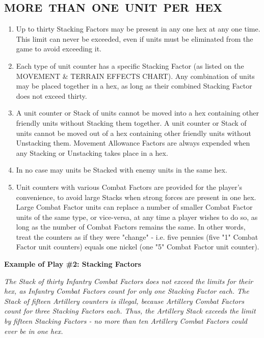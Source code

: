 \subsection[MORE THAN ONE UNIT PER HEX]{\mbox{MORE THAN ONE UNIT PER HEX}}

\begin{enumerate}
  \item Up to thirty Stacking Factors may be present in any one hex at any one time. This limit can never be exceeded, even if units must be eliminated from the game to avoid exceeding it.

  \item Each type of unit counter has a specific Stacking Factor (as listed on the MOVEMENT \& TERRAIN EFFECTS CHART). Any combination of units may be placed together in a hex, as long as their combined Stacking Factor does not exceed thirty.

  \item A unit counter or Stack of units cannot be moved into a hex containing other friendly units without Stacking them together. A unit counter or Stack of units cannot be moved out of a hex containing other friendly units without Unstacking them. Movement Allowance Factors are always expended when any Stacking or Unstacking takes place in a hex.

  \item In no case may units be Stacked with enemy units in the same hex.

  \item Unit counters with various Combat Factors are provided for the player's convenience, to avoid large Stacks when strong forces are present in one hex. Large Combat Factor units can replace a number of smaller Combat Factor units of the same type, or vice-versa, at any time a player wishes to do so, as long as the number of Combat Factors remains the same. In other words, treat the counters as if they were "change" - i.e. five pennies (five "1" Combat Factor unit counters) equals one nickel (one "5" Combat Factor unit counter).
\end{enumerate}

\textbf{Example of Play \#2: Stacking Factors}

\textit{The Stack of thirty Infantry Combat Factors does not exceed the limits for their hex, as Infantry Combat Factors count for only one Stacking Factor each. The Stack of fifteen Artillery counters is illegal, because Artillery Combat Factors count for three Stacking Factors each. Thus, the Artillery Stack exceeds the limit by fifteen Stacking Factors - no more than ten Artillery Combat Factors could ever be in one hex.}

